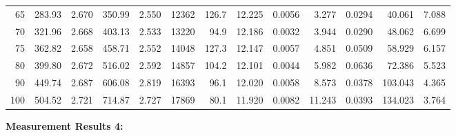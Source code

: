 \documentclass[10pt]{article}
\begin{document}
{\begin{tabular}{|r|rr|rr|rr|rr|rr|r|r|}
       65 &       283.93 &        2.670 &       350.99 &        2.550 &        12362 &        126.7 &       12.225 &       0.0056 &        3.277 &       0.0294 &       40.061 &        7.088 \\
       70 &       321.96 &        2.668 &       403.13 &        2.533 &        13220 &         94.9 &       12.186 &       0.0032 &        3.944 &       0.0290 &       48.062 &        6.699 \\
       75 &       362.82 &        2.658 &       458.71 &        2.552 &        14048 &        127.3 &       12.147 &       0.0057 &        4.851 &       0.0509 &       58.929 &        6.157 \\
       80 &       399.80 &        2.672 &       516.02 &        2.592 &        14857 &        104.2 &       12.101 &       0.0044 &        5.982 &       0.0636 &       72.386 &        5.523 \\
       90 &       449.74 &        2.687 &       606.08 &        2.819 &        16393 &         96.1 &       12.020 &       0.0058 &        8.573 &       0.0378 &      103.043 &        4.365 \\
      100 &       504.52 &        2.721 &       714.87 &        2.727 &        17869 &         80.1 &       11.920 &       0.0082 &       11.243 &       0.0393 &      134.023 &        3.764 \\
\hline
\end{tabular}
}

\vspace{3mm}

\noindent
{\large \bf Measurement Results 4:}
\vspace{3mm}
\end{document}

